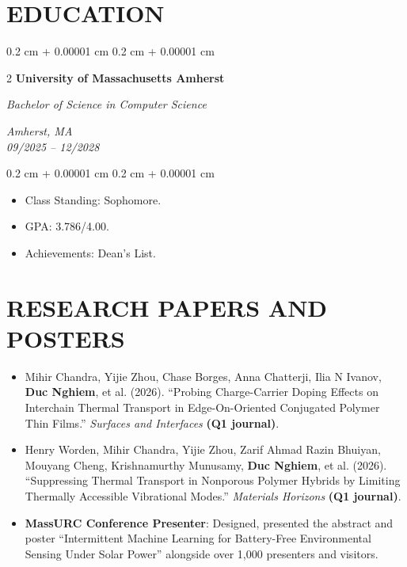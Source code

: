 \documentclass[10pt, letterpaper]{article}
\newenvironment{highlights}{
    \begin{itemize}[
        topsep=0.03 cm,
        parsep=0.03 cm,
        partopsep=0pt,
        itemsep=0pt,
        leftmargin=0.4 cm + 10pt
    ]
}{
    \end{itemize}
} %
\newenvironment{onecolentry}{
    \begin{adjustwidth}{
        0.2 cm + 0.00001 cm
    }{
        0.2 cm + 0.00001 cm
    }
}{
    \end{adjustwidth}
} %
\newenvironment{twocolentry}[2][]{
    \onecolentry
    \def\secondColumn{#2}
    \setcolumnwidth{\fill, 3.5 cm}
    \begin{paracol}{2}
}{
    \switchcolumn \raggedleft \secondColumn
    \end{paracol}
    \endonecolentry
} %
\let\hrefWithoutArrow\href
\renewcommand{\href}[2]{\hrefWithoutArrow{#1}{\ifthenelse{\equal{#2}{}}{ }{#2 }\raisebox{.15ex}{\footnotesize \faExternalLink*}}}
\begin{document}
\section{EDUCATION}
    \begin{twocolentry}{\color{primaryColor}\textit{Amherst, MA\\09/2025 -- 12/2028}} %
        \color{primaryColor}\textbf{University of Massachusetts Amherst}

        \color{primaryColor}\textit{Bachelor of Science in Computer Science} %
    \end{twocolentry}
    \begin{onecolentry}
        \begin{highlights}
            \item Class Standing: Sophomore.
            \item GPA: 3.786/4.00.
            \item Achievements: Dean's List.
        \end{highlights}
    \end{onecolentry}

\section{RESEARCH PAPERS AND POSTERS}
    \begin{highlights}
        \item Mihir Chandra, Yijie Zhou, Chase Borges, Anna Chatterji, Ilia N Ivanov, \textbf{Duc Nghiem}, et al. (2026). ``Probing Charge-Carrier Doping Effects on Interchain Thermal Transport in Edge-On-Oriented Conjugated Polymer Thin Films.'' \textit{Surfaces and Interfaces} \textbf{(Q1 journal)}. \href{https://www.sciencedirect.com/science/article/abs/pii/S2468023026011855}{\color{primaryColor}\textbf{[Link]}}

        \item Henry Worden, Mihir Chandra, Yijie Zhou, Zarif Ahmad Razin Bhuiyan, Mouyang Cheng, Krishnamurthy Munusamy, \textbf{Duc Nghiem}, et al. (2026). ``Suppressing Thermal Transport in Nonporous Polymer Hybrids by Limiting Thermally Accessible Vibrational Modes.'' \textit{Materials Horizons} \textbf{(Q1 journal)}. \href{https://pubs.rsc.org/en/content/articlelanding/2026/mh/d6mh00633g/unauth}{\color{primaryColor}\textbf{[Link]}}

        \item \textbf{MassURC Conference Presenter}: Designed, presented the abstract and poster ``Intermittent Machine Learning for Battery-Free Environmental Sensing Under Solar Power'' alongside over 1,000 presenters and visitors. \href{https://drive.google.com/file/d/1O7UtcfBeMW_6hkVAZdXeO6UL-9rr1e4Q/view?usp=sharing}{\color{primaryColor}\textbf{[Link]}}
    \end{highlights}
\end{document}
